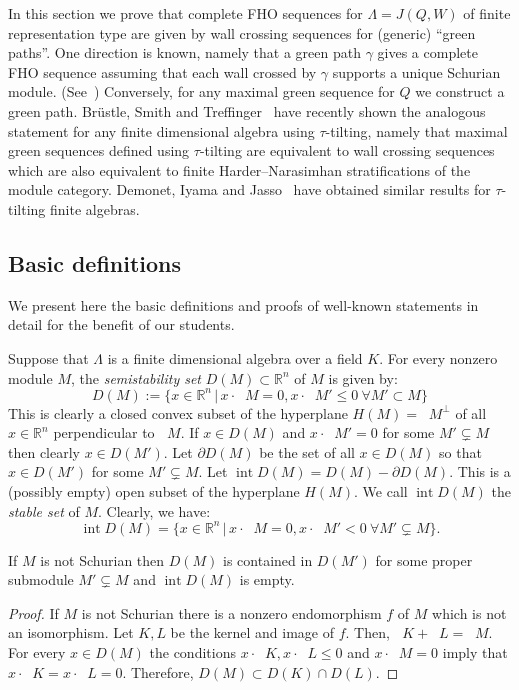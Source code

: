 \documentclass[ALCO,ThmDefs,Unicode,epreuves]{cedram}
\DeclareMathOperator{\undim}{\underline{dim}}
\DeclareMathOperator{\intr}{int}
\newcommand{\field}[1]{\mathbb{#1}}
\newcommand{\RR}{\ensuremath{{\field{R}}}}
\begin{document}
In this section we prove that complete FHO sequences for $\Lambda=J(Q,W)$ of finite representation type are given by wall crossing sequences for (generic) ``green paths''. One direction is known, namely that a green path $\gamma$ gives a complete FHO sequence assuming that each wall crossed by $\gamma$ supports a unique Schurian module. (See~\cite[Theorems~3.6,~3.8.]{PartI}) Conversely, for any maximal green sequence for $Q$ we construct a green path. Br{\"u}stle, Smith and Treffinger~\cite{BST} have recently shown the analogous statement for any finite dimensional algebra using $\tau$-tilting, namely that maximal green sequences defined using $\tau$-tilting are equivalent to wall crossing sequences which are also equivalent to finite Harder--Narasimhan stratifications of the module category. Demonet, Iyama and Jasso~\cite{DIJ} have obtained similar results for $\tau$-tilting finite algebras.

\subsection{Basic definitions} We present here the basic definitions and proofs of well-known statements in detail for the benefit of our students.



Suppose that $\Lambda$ is a finite dimensional algebra over a field $K$. For every nonzero module $M$, the \emph{semistability set} $D(M)\subset \RR^n$ of $M$ is given by:
\[
	D(M):=\{x\in\RR^n\,|\, x\cdot \undim M=0, x\cdot \undim M'\le 0\ \forall M'\subset M\}
\]
 This is clearly a closed convex subset of the hyperplane $H(M)=\undim M^\perp$ of all $x\in\RR^n$ perpendicular to $\undim M$. If $x\in D(M)$ and $x\cdot \undim M'=0$ for some $M'\subsetneq M$ then clearly $x\in D(M')$. Let $\partial D(M)$ be the set of all $x\in D(M)$ so that $x\in D(M')$ for some $M'\subsetneq M$. Let $\intr D(M)=D(M)-\partial D(M)$. This is a (possibly empty) open subset of the hyperplane $H(M)$. We call $\intr D(M)$ the \emph{stable set} of $M$. Clearly, we have:
\[
	\intr D(M)=\{x\in\RR^n\,|\, x\cdot \undim M=0, x\cdot \undim M'< 0\ \forall M'\subsetneq M\}.
\]


\begin{prop}\label{prop: int D(M) is empty for nonSchurian M}
If $M$ is not Schurian then $D(M)$ is contained in $D(M')$ for some proper submodule $M'\subsetneq M$ and $\intr D(M)$ is empty.
\end{prop}

\begin{proof}
If $M$ is not Schurian there is a nonzero endomorphism $f$ of $M$ which is not an isomorphism. Let $K,L$ be the kernel and image of $f$. Then, $\undim K+\undim L=\undim M$. For every $x\in D(M)$ the conditions $x\cdot \undim K,x\cdot \undim L\le0$ and $x\cdot\undim M=0$ imply that $x\cdot \undim K=x\cdot \undim L=0$. Therefore, $D(M)\subset D(K)\cap D(L)$.
\end{proof}
\end{document}
